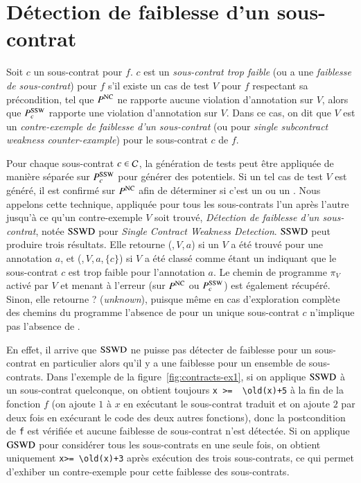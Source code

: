 \section{Détection de faiblesse d'un sous-contrat}
\label{sec:swd-single}


\begin{definition} 
  \label{def:SSW}
  Soit $c$ un sous-contrat pour $f$.
  $c$ est un \emph{sous-contrat trop faible} (ou a une
  \emph{faiblesse de sous-contrat}) pour $f$ s'il existe un cas de test $V$ pour
   $f$ respectant sa précondition, tel que $P^{\mathrm{NC}}$ ne rapporte aucune violation
  d'annotation sur $V$, alors que $P_c^{\mathrm{SSW}}$ rapporte une violation
  d'annotation sur $V$.
  Dans ce cas, on dit que $V$ est un
  \emph{contre-exemple de faiblesse d'un sous-contrat} (ou \SSWCE pour
  \textit{single subcontract weakness counter-example}) pour le sous-contrat
  $c$ de $f$.
\end{definition}

Pour chaque sous-contrat $c\in{\ensuremath\mathcal{C}}$, la génération de tests peut être appliquée
de manière séparée sur $P_{c}^{\mathrm{SSW}}$ pour générer des \SSWCE potentiels.
Si un tel cas de test $V$ est généré, il est confirmé sur $P^{\mathrm{NC}}$ afin de
déterminer si c'est un \NCCE ou un \SSWCE.
Nous appelons cette technique, appliquée pour tous les sous-contrats l'un après
l'autre jusqu'à ce qu'un contre-exemple $V$ soit trouvé,
\emph{Détection de faiblesse d'un sous-contrat}, notée $\mathrm{SSWD}$ pour
\textit{Single Contract Weakness Detection}.
$\mathrm{SSWD}$ peut produire trois résultats.
Elle retourne (\nc,\,$V$,\,$a$) si un \NCCE $V$ a été trouvé pour une annotation
$a$, et (\cw,\,$V$,\,$a$,\,$\{c\}$) si $V$ a été classé comme étant un \SSWCE
indiquant que le sous-contrat $c$ est trop faible pour l'annotation $a$.
Le chemin de programme $\pi_V$ activé par $V$ et menant à l'erreur (sur $P^{\mathrm{NC}}$
ou $P_c^{\mathrm{SSW}}$) est également récupéré.
Sinon, elle retourne \textsf{?} ({\em unknown}), puisque même en cas
d'exploration complète des chemins du programme l'absence de \SSWCE pour un
unique sous-contrat $c$ n'implique pas l'absence de \GSWCE.

En effet, il arrive que $\mathrm{SSWD}$ ne puisse pas détecter de faiblesse pour un
sous-contrat en particulier alors qu'il y a une faiblesse pour un ensemble de
sous-contrats.
Dans l'exemple de la figure~\ref{fig:contracts-ex1}, si on applique $\mathrm{SSWD}$ à
un sous-contrat quelconque, on obtient toujours \lstinline'x >=  \old(x)+5' à la
fin de la fonction $f$ (on ajoute $1$ à $x$ en exécutant le sous-contrat traduit
et on ajoute $2$ par deux fois en exécurant le code des deux autres fonctions),
donc la postcondition de \lstinline'f' est vérifiée et aucune faiblesse de
sous-contrat n'est détectée.
Si on applique $\mathrm{GSWD}$ pour considérer tous les sous-contrats en une seule fois,
on obtient uniquement \lstinline'x>= \old(x)+3' après exécution des trois
sous-contrats, ce qui permet d'exhiber un contre-exemple pour cette faiblesse
des sous-contrats.

